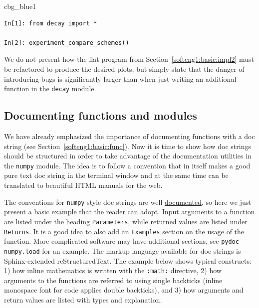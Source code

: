 \documentclass[%
oneside,                 %
final,                   %
10pt]{article}
\newenvironment{_cod_tight}[1]{
   \def\FrameCommand{\colorbox{#1}}
   \FrameRule0.6pt\MakeFramed {\FrameRestore}\vskip3mm}
   {\vskip0mm\endMakeFramed}
\newenvironment{cod}[1]{
\bgroup\rmfamily
\fboxsep=0mm\relax
\begin{_cod_tight}{#1}
\list{}{\parsep=-2mm\parskip=0mm\topsep=0pt\leftmargin=2mm
\rightmargin=2\leftmargin\leftmargin=4pt\relax}
\item\relax}
{\endlist\end{_cod_tight}\egroup}
\begin{document}
\begin{cod}{cbg_blue1}\begin{Verbatim}[numbers=none,fontsize=\fontsize{9pt}{9pt},baselinestretch=0.95,xleftmargin=2mm]
In[1]: from decay import *

In[2]: experiment_compare_schemes()
\end{Verbatim}
\end{cod}
\noindent

We do not present how the flat program from
Section~\ref{softeng1:basic:impl2} must be refactored to produce the
desired plots, but simply state that the danger of introducing bugs
is significantly larger than when just writing an additional function
in the \texttt{decay} module.

\subsection{Documenting functions and modules}
\label{softeng1:basic:docstring}

We have already emphasized the importance of documenting functions with
a doc string (see Section~\ref{softeng1:basic:func}). Now it is time
to show how doc strings should be structured in order to take advantage
of the documentation utilities in the \texttt{numpy} module. The idea is
to follow a convention that in itself makes a good pure text doc string
in the terminal window
and at the same time can be translated to beautiful HTML manuals for
the web.

The conventions for \texttt{numpy} style doc strings are well
\href{{https://github.com/numpy/numpy/blob/master/doc/HOWTO_DOCUMENT.rst.txt}}{documented}, so here we just present a basic example that the reader can adopt.
Input arguments to a function are listed under the heading \texttt{Parameters},
while returned values are listed under \texttt{Returns}. It is a good idea to
also add an \texttt{Examples} section on the usage of the function.
More complicated software may have additional sections, see \texttt{pydoc numpy.load}
for an example. The markup language available for doc strings is
Sphinx-extended reStructuredText. The example below shows typical
constructs: 1) how inline
mathematics is written with the \texttt{:math:} directive, 2) how arguments
to the functions are referred to using single backticks
(inline monospace font for code applies double backticks), and 3) how
arguments and return values are listed with types and explanation.
\end{document}
